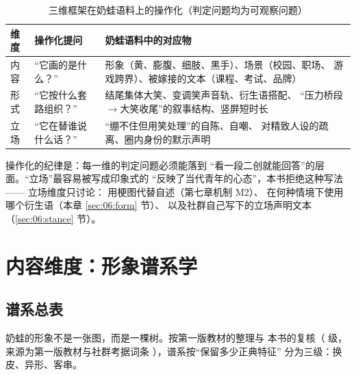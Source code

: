 \begin{table}[htbp]\centering
  \caption{三维框架在奶蛙语料上的操作化（判定问题均为可观察问题）}
  \label{tab:06:ops}
  \small
  \begin{tabularx}{\textwidth}{@{}llX@{}}
    \toprule
    维度 & 操作化提问 & 奶蛙语料中的对应物 \\ \midrule
    内容 & “它画的是什么？” &
      形象（黄、膨腹、细肢、黑手）、场景（校园、职场、
      游戏跨界）、被嫁接的文本（课程、考试、品牌） \\
    形式 & “它按什么套路组织？” &
      结尾集体大笑、变调笑声音轨、衍生语搭配、
      “压力桥段$\to$大笑收尾”的叙事结构、竖屏短时长 \\
    立场 & “它在替谁说什么话？” &
      “绷不住但用笑处理”的自陈、自嘲、
      对精致人设的疏离、圈内身份的默示声明 \\ \bottomrule
  \end{tabularx}
\end{table}

操作化的纪律是：每一维的判定问题必须能落到
“看一段二创就能回答”的层面。“立场”最容易被写成印象式的
“反映了当代青年的心态”，本书拒绝这种写法——
立场维度只讨论：
用梗图代替自述（第七章机制 M2）、
在何种情境下使用哪个衍生语（本章 \ref{sec:06:form} 节）、
以及社群自己写下的立场声明文本（\ref{sec:06:stance} 节）。

\section{内容维度：形象谱系学}\label{sec:06:content}

\subsection{谱系总表}

奶蛙的形象不是一张图，而是一棵树。按第一版教材的整理与
本书的复核（ 级，来源为第一版教材与社群考据词条
\cite{lostmedia2026naiwa}），谱系按“保留多少正典特征”
分为三级：换皮、异形、客串。

